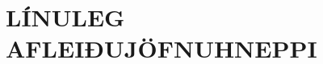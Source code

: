 \newenvironment{se}{\begin{setning+}\sl}{\hfill$\square$\end{setning+}\rm}
\newenvironment{sex}{\begin{setning+}\sl}{\hfill$\blacksquare$\end{setning+}\rm}
\newenvironment{sk}{\begin{skilgreining+}\rm}{\hfill$\square$\end{skilgreining+}\rm}
\newenvironment{sesk}{\begin{setningogskilgreining+}\rm}{\hfill$\square$\end{setningogskilgreining+}\rm}
\newenvironment{hs}{\begin{hjalparsetning+}\sl}{\hfill$\square$\end{hjalparsetning+}\rm}
\newenvironment{fs}{\begin{fylgisetning+}\sl}{\hfill$\square$\end{fylgisetning+}\rm}
\newenvironment{sy}{\begin{synidaemi+}\rm}{\hfill$\square$\end{synidaemi+}\rm}
\newenvironment{fo}{\begin{forrit+}\rm}{\hfill\end{forrit+}\rm}
\newenvironment{so}{\medbreak\noindent{\it Sönnun:}\rm}{\hfill$\blacksquare$\rm}
\newenvironment{sotx}[1]{\medbreak\noindent{\it #1:}\rm}{\hfill$\blacksquare$\rm}
\newcommand{\aefing}{\section{Æfingardæmi}

\subsection{Æfingardæmi} \setcounter{daemateljari}{1}}
\newcommand{\daemi}{
{\medskip\noindent{\bf \thedaemateljari.}}
\addtocounter{daemateljari}{1}
}

\def\svar#1{\smallskip\noindent{\bf #1.} \ }
\def\lausn#1{\smallskip\noindent{\bf #1.} \ }
\def\ugrein#1{\medbreak\noindent{\bf #1.} }
\newcommand{\samantekt}{\noindent{\bf Samantekt.} }

%
%
%

\chapter{LÍNULEG AFLEIÐUJÖFNUHNEPPI}


